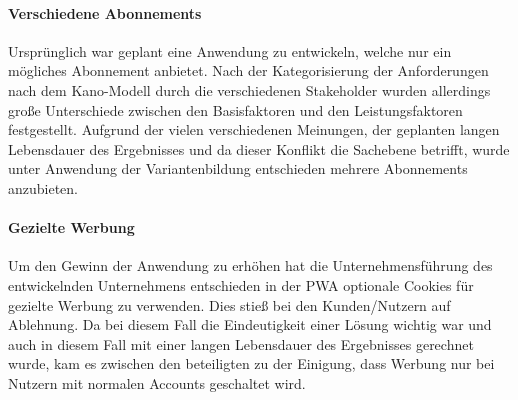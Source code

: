 \paragraph{Verschiedene Abonnements}
Ursprünglich war geplant eine Anwendung zu entwickeln, welche nur ein mögliches Abonnement anbietet.
Nach der Kategorisierung der Anforderungen nach dem Kano-Modell durch die verschiedenen Stakeholder wurden allerdings
große Unterschiede zwischen den Basisfaktoren und den Leistungsfaktoren festgestellt.
Aufgrund der vielen verschiedenen Meinungen, der geplanten langen Lebensdauer des Ergebnisses und da dieser Konflikt die
Sachebene betrifft, wurde unter Anwendung der Variantenbildung entschieden mehrere Abonnements anzubieten.

\paragraph{Gezielte Werbung}
Um den Gewinn der Anwendung zu erhöhen hat die Unternehmensführung des entwickelnden Unternehmens entschieden in der PWA
optionale Cookies für gezielte Werbung zu verwenden.
Dies stieß bei den Kunden/Nutzern auf Ablehnung.
Da bei diesem Fall die Eindeutigkeit einer Lösung wichtig war und auch in diesem Fall mit einer langen Lebensdauer des
Ergebnisses gerechnet wurde, kam es zwischen den beteiligten zu der Einigung, dass Werbung nur bei Nutzern mit normalen
Accounts geschaltet wird.
